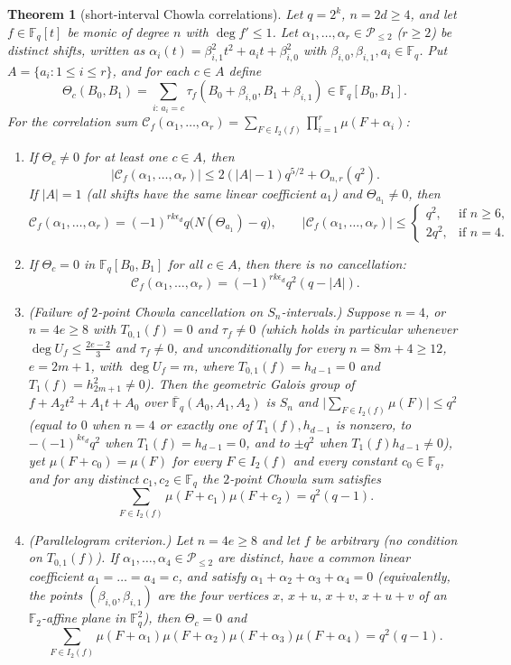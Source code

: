\documentclass[11pt,a4paper]{amsart}
\newtheorem{theorem}{Theorem}[section]
\theoremstyle{remark}
\numberwithin{equation}{section}
\newcommand{\Fq}{\mathbb{F}_q}
\newcommand{\Ftwo}{\mathbb{F}_2}
\newcommand{\Pe}{\mathcal{P}}
\begin{document}
\begin{theorem}[short-interval Chowla correlations]\label{thm:chowla}
Let $q=2^k$, $n=2d\ge 4$, and let $f\in\Fq[t]$ be monic of degree $n$ with $\deg f'\le 1$. Let
$\alpha_1,\dots,\alpha_r\in\Pe_{\le 2}$ ($r\ge 2$) be distinct shifts, written as
$\alpha_i(t)=\beta_{i,1}^2t^2+a_it+\beta_{i,0}^2$ with $\beta_{i,0},\beta_{i,1},a_i\in\Fq$. Put
$A=\{a_i:1\le i\le r\}$, and for each $c\in A$ define
\[
\Theta_c(B_0,B_1)=\sum_{i:\,a_i=c}\tau_f(B_0+\beta_{i,0},B_1+\beta_{i,1})\in\Fq[B_0,B_1].
\]
For the correlation sum $\mathcal{C}_f(\alpha_1,\dots,\alpha_r)=\sum_{F\in I_2(f)}\prod_{i=1}^r\mu(F+\alpha_i)$:
\begin{enumerate}
\item[(a)] If $\Theta_c\ne 0$ for at least one $c\in A$, then
\[
\bigl|\mathcal{C}_f(\alpha_1,\dots,\alpha_r)\bigr|\le 2(|A|-1)q^{5/2}+O_{n,r}(q^2).
\]
If $|A|=1$ (all shifts have the same linear coefficient $a_1$) and $\Theta_{a_1}\ne 0$, then
\[
\mathcal{C}_f(\alpha_1,\dots,\alpha_r)=(-1)^{rk\epsilon_d}q\bigl(N(\Theta_{a_1})-q\bigr),
\qquad \bigl|\mathcal{C}_f(\alpha_1,\dots,\alpha_r)\bigr|\le
\begin{cases} q^2, & \text{if }n\ge 6,\\ 2q^2, & \text{if }n=4.\end{cases}
\]
\item[(b)] If $\Theta_c=0$ in $\Fq[B_0,B_1]$ for all $c\in A$, then there is no cancellation:
\[
\mathcal{C}_f(\alpha_1,\dots,\alpha_r)=(-1)^{rk\epsilon_d}q^2(q-|A|).
\]
\item[(c)] (\emph{Failure of $2$-point Chowla cancellation on $S_n$-intervals.}) Suppose $n=4$, or $n=4e\ge 8$ with
$T_{0,1}(f)=0$ and $\tau_f\ne 0$ (which holds in particular whenever $\deg U_f\le\frac{2e-2}{3}$ and $\tau_f\ne 0$,
and unconditionally for every $n=8m+4\ge 12$, $e=2m+1$, with $\deg U_f=m$, where $T_{0,1}(f)=h_{d-1}=0$ and
$T_1(f)=h_{2m+1}^2\ne 0$). Then the geometric Galois group of $f+A_2t^2+A_1t+A_0$ over
$\overline{\mathbb F}_q(A_0,A_1,A_2)$ is $S_n$ and
$\bigl|\sum_{F\in I_2(f)}\mu(F)\bigr|\le q^2$ (equal to $0$ when $n=4$ or exactly one of $T_1(f),h_{d-1}$ is nonzero,
to $-(-1)^{k\epsilon_d}q^2$ when $T_1(f)=h_{d-1}=0$, and to $\pm q^2$ when $T_1(f)h_{d-1}\ne0$), yet $\mu(F+c_0)=\mu(F)$ for every
$F\in I_2(f)$ and every constant $c_0\in\Fq$, and for any distinct $c_1,c_2\in\Fq$ the $2$-point Chowla sum satisfies
\[
\sum_{F\in I_2(f)}\mu(F+c_1)\mu(F+c_2)=q^2(q-1).
\]
\item[(d)] (\emph{Parallelogram criterion.}) Let $n=4e\ge 8$ and let $f$ be arbitrary (no condition on $T_{0,1}(f)$).
If $\alpha_1,\dots,\alpha_4\in\Pe_{\le 2}$ are distinct, have a common linear coefficient $a_1=\dots=a_4=c$, and satisfy
$\alpha_1+\alpha_2+\alpha_3+\alpha_4=0$ (equivalently, the points $(\beta_{i,0},\beta_{i,1})$ are the four vertices
$x,\,x+u,\,x+v,\,x+u+v$ of an $\Ftwo$-affine plane in $\Fq^2$), then $\Theta_c=0$ and
\[
\sum_{F\in I_2(f)}\mu(F+\alpha_1)\mu(F+\alpha_2)\mu(F+\alpha_3)\mu(F+\alpha_4)=q^2(q-1).
\]
\end{enumerate}
\end{theorem}
\end{document}
